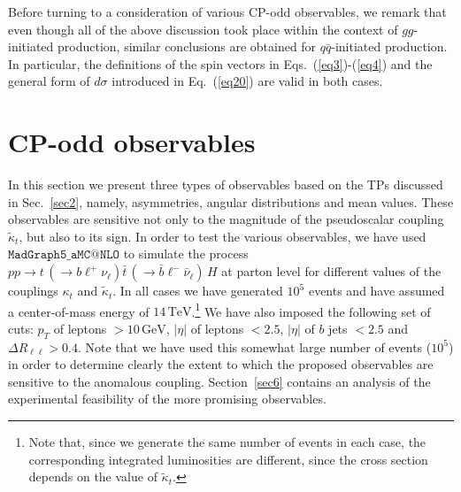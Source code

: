 \documentclass[aps,preprint,tightenlines,floatfix,superscriptaddress,nofootinbib,showpacs]{revtex4-1}
\def\tbar{\bar{t}}
\def\bbar{\bar{b}}
\def\qbar{\bar{q}}
\def\nubar{{\bar{\nu}}_{\ell}}
\def\ppprocess{pp\to t\,\left(\rightarrow b {\ell}^+ \nu_{\ell}\right) \tbar\,\left(\rightarrow\bbar {\ell}^-\nubar\right)\,H}
\def\kp{\kappa_t}
\def\kpt{\tilde{\kappa}_t}
\begin{document}
Before turning to a consideration of various CP-odd observables,
we remark that even though all of the above discussion took place
within the context of $gg$-initiated production, similar conclusions
are obtained for $q\qbar$-initiated production. In particular, the
definitions of the spin vectors in Eqs.~(\ref{eq3})-(\ref{eq4}) and
the general form of $d\sigma$ introduced in Eq.~(\ref{eq20}) are valid
in both cases.
\bigskip
\section{$\mathrm{\mathbf{CP}}$-odd observables}
\label{sec3}
In this section we present three types of observables based on the TPs discussed
in Sec.~\ref{sec2}, namely, asymmetries, angular
distributions and mean values. These observables are sensitive not only to the
magnitude of the pseudoscalar coupling $\kpt$, but also to its
sign.  In order to test the various observables, we have
used $\mathtt{MadGraph5\_aMC@NLO}$ \cite{Madgraph} to simulate the process
$\ppprocess$ at parton level for different values of the couplings
$\kp$ and $\kpt$.  In all cases we have generated $10^5$ events
and have assumed a center-of-mass energy of
$14\,\mathrm{TeV}$.\footnote{Note that, since we generate
  the same number of events in
  each case, the corresponding integrated luminosities are different, since the
  cross section depends on the value of $\kpt$.}
We have also imposed the
following set of cuts: $p_T$ of leptons $> 10\,\mathrm{GeV}$, $|\eta|$
of leptons $< 2.5$, $|\eta|$ of $b$ jets $< 2.5$ and $\Delta
R_{\ell\ell}>0.4$.  Note that we have used this
somewhat large number of events ($10^5$) in order to determine clearly
the extent to which the proposed observables are sensitive to the anomalous
coupling.  Section~\ref{sec6} contains an
analysis of the experimental feasibility of the more promising observables.
\end{document}
